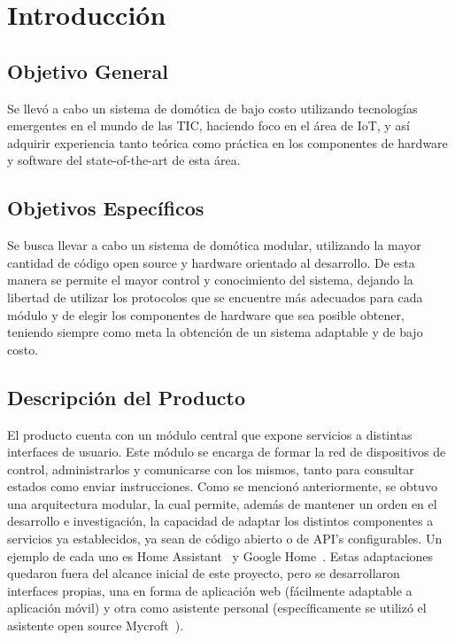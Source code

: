 \chapter{Introducción}

\section{Objetivo General}

Se llevó a cabo un sistema de domótica de bajo costo utilizando tecnologías emergentes en el mundo de las TIC, haciendo foco en el área de IoT, y así adquirir experiencia tanto teórica como práctica en los componentes de hardware y software del state-of-the-art de esta área.

\section{Objetivos Específicos}

Se busca llevar a cabo un sistema de domótica modular, utilizando la mayor cantidad de código open source y hardware orientado al desarrollo. De esta manera se permite el mayor control y conocimiento del sistema, dejando la libertad de utilizar los protocolos que se encuentre más adecuados para cada módulo y de elegir los componentes de hardware que sea posible obtener, teniendo siempre como meta la obtención de un sistema adaptable y de bajo costo.

\section{Descripción del Producto}

El producto cuenta con un módulo central que expone servicios a distintas interfaces de usuario. Este módulo se encarga de formar la red de dispositivos de control, administrarlos y comunicarse con los mismos, tanto para consultar estados como enviar instrucciones. 
Como se mencionó anteriormente, se obtuvo una arquitectura modular, la cual permite, además de mantener un orden en el desarrollo e investigación, la capacidad de adaptar los distintos componentes a servicios ya establecidos, ya sean de código abierto o de API's configurables. Un ejemplo de cada uno es Home Assistant~\cite{HomeAssistant} y Google Home~\cite{GoogleHome}.
Estas adaptaciones quedaron fuera del alcance inicial de este proyecto, pero se desarrollaron interfaces propias, una en forma de aplicación web (fácilmente adaptable a aplicación móvil) y otra como asistente personal (específicamente se utilizó el asistente open source Mycroft~\cite{Mycroft}).


